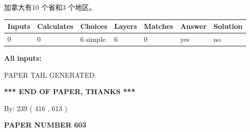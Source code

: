 \documentclass{ctexart}
\begin{document}
 
加拿大有10 个省和3 个地区。
 
 
\noindent{}
 
 
   
   
   
   
\noindent\begin{tabular}{|l|l|l|l|l|l|l|}
 \hline
Inputs & Calculates & Choices & Layers & Matches & Answer & Solution \\ \hline
 0  & 
 0  & 
 6
  simple  
  & 
 6  & 
 0  & 
  yes & 
  no 
  \\ \hline
 \end{tabular}
   
   
   
   
\noindent{}
   
   
   
   
\noindent\vspace{0.1in}\hspace{-0.08in} {\textbf{\Large{All inputs: }}}
   
   
   
   
   
   
 \vspace{0.2in}
 
   
   
\vspace{2.0in} PAPER TAIL GENERATED.
   
   
   
   
\vspace{1.0in} 
{\textbf{\large{ *** END OF PAPER, THANKS *** }}} 
   
   
\hspace{1.0in} By: 
 239 ( 416 ,  613 )
   
   
   
   
\newpage 
\setcounter{page}{ 
   603001 } 
   
   
   
   
 {\textbf{ \Large{ PAPER NUMBER  603  }}}
   
   
\vspace{0.2in}
   
   
   
   
   
   
   
\end{document}
